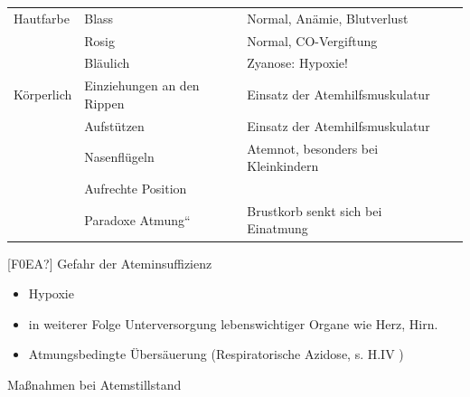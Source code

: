 \documentclass{article}
\begin{document}
\begin{center}
\begin{tabular}{|m{3.225cm}|m{3.225cm}|m{3.225cm}|m{3.225cm}|}
 &
 &
\\\hline
{\mdseries\color{black} Hautfarbe}

 &
{\mdseries Blass}

 &
{\mdseries Normal, An\"amie, Blutverlust}

 &
\\\hline
 &
{\mdseries Rosig}

 &
{\mdseries Normal, CO-Vergiftung}

 &
\\\hline
 &
{\mdseries Bl\"aulich }

 &
{\mdseries Zyanose: Hypoxie!}

 &
\\\hline
{\mdseries\color{black} K\"orperlich}

 &
{\mdseries Einziehungen an den Rippen}

 &
{\mdseries Einsatz der Atemhilfsmuskulatur}

 &
\\\hline
 &
{\mdseries Aufst\"utzen}

 &
{\mdseries Einsatz der Atemhilfsmuskulatur}

 &
\\\hline
 &
{\mdseries Nasenfl\"ugeln}

 &
{\mdseries Atemnot, besonders bei Kleinkindern}

 &
\\\hline
 &
{\mdseries Aufrechte Position}

 &
 &
\\\hline
 &
{\mdseries {\quotedblbase}Paradoxe Atmung{\textquotedblleft}}

 &
{\mdseries Brustkorb senkt sich bei Einatmung}

 &
\\\hline
\end{tabular}
\end{center}
{\mdseries\color{black}
\textcolor[rgb]{0.7882353,0.0,0.08627451}{[F0EA?]} Gefahr der
Ateminsuffizienz}

\begin{itemize}
\item {\mdseries
Hypoxie}

\end{itemize}
\begin{itemize}
\item {\mdseries
in weiterer Folge Unterversorgung lebenswichtiger Organe wie Herz,
Hirn.}

\end{itemize}
\begin{itemize}
\item {\mdseries
Atmungsbedingte \"Ubers\"auerung (Respiratorische Azidose, s. H.IV )}

\end{itemize}
{\mdseries\color{black}
Ma{\ss}nahmen bei Atemstillstand}
\end{document}
